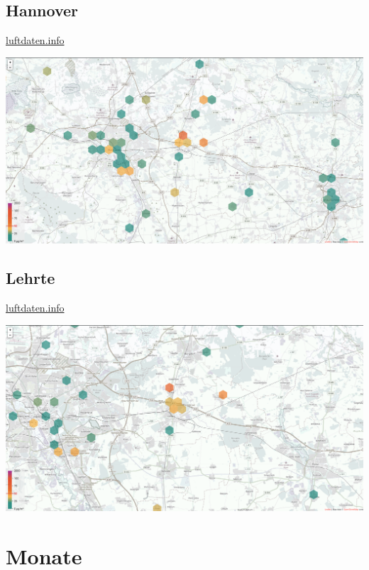 \documentclass[aspectratio=169]{beamer} %
\begin{document}
\subsection{Hannover}
\begin{frame}{\href{http://hannover.maps.luftdaten.info/\#10/52.373/10.005}{luftdaten.info}}
  \begin{center}
    \includegraphics[width=\textwidth]{../screenshots/luftdaten-zoom-b.png}
  \end{center}
\end{frame}
\subsection{Lehrte}
\begin{frame}{\href{http://hannover.maps.luftdaten.info/\#12/52.373/10.005}{luftdaten.info}}
  \begin{center}
    \includegraphics[width=\textwidth]{../screenshots/luftdaten-zoom-a.png}
  \end{center}
\end{frame}

\section{Monate}
\end{document}
